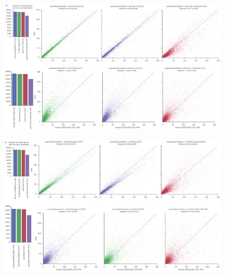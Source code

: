 \documentclass[fleqn,10pt]{wlscirep}
\begin{document}
\begin{figure}
\includegraphics[width=0.95\textheight,keepaspectratio,angle=90]{chimp-cross-species.pdf}
\end{figure}

\begin{figure}
\ContinuedFloat
\includegraphics[width=0.95\textheight,keepaspectratio,angle=90]{orang-cross-species.pdf}
\end{figure}
\end{document}
